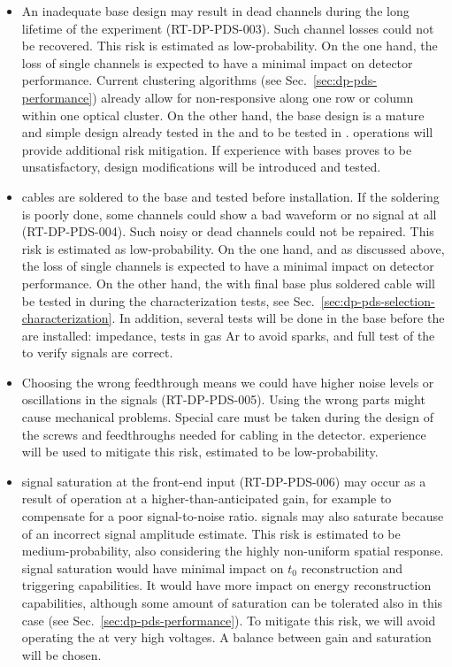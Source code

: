 \begin{itemize}
\item An inadequate  base design may result in dead  channels during the long lifetime of the experiment (RT-DP-PDS-003). Such channel losses could not be recovered. This risk is estimated as low-probability. On the one hand, the loss of single  channels is expected to have a minimal impact on detector performance. Current  clustering algorithms (see Sec.~\ref{sec:dp-pds-performance}) already allow for non-responsive  along one row or column within one optical cluster. On the other hand, the  base design is a mature and simple design already tested in the  and to be tested in .  operations will provide additional risk mitigation. If  experience with  bases proves to be unsatisfactory, design modifications will be introduced and tested.

\item {} cables are soldered to the  base and tested before installation. If the soldering is poorly done, some channels could show a bad waveform or no signal at all (RT-DP-PDS-004). Such noisy or dead channels could not be repaired. This risk is estimated as low-probability. On the one hand, and as discussed above, the loss of single  channels is expected to have a minimal impact on detector performance. On the other hand, the  with final base plus soldered cable will be tested in \lntwo during the  characterization tests, see Sec.~\ref{sec:dp-pds-selection-characterization}. In addition, several tests will be done in the base before the  are installed: impedance,  tests in gas Ar to avoid sparks, and full test of the  to verify signals are correct.

\item Choosing the wrong feedthrough means we could have higher noise levels or oscillations in the signals (RT-DP-PDS-005). Using the wrong parts might cause mechanical problems. Special care must be taken during the design of the screws and  feedthroughs needed for cabling in the detector.  experience will be used to mitigate this risk, estimated to be low-probability.

\item {} signal saturation at the front-end input (RT-DP-PDS-006) may occur as a result of operation at a higher-than-anticipated  gain, for example to compensate for a poor signal-to-noise ratio.  signals may also saturate because of an incorrect signal amplitude estimate. This risk is estimated to be medium-probability, also considering the highly non-uniform  spatial response.  signal saturation would have minimal impact on  $t_0$ reconstruction and triggering capabilities. It would have more impact on  energy reconstruction capabilities, although some amount of saturation can be tolerated also in this case (see Sec.~\ref{sec:dp-pds-performance}). To mitigate this risk, we will avoid operating the  at very high voltages. A balance between gain and saturation will be chosen.


\end{itemize}
